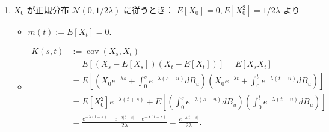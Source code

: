 \documentclass{jsarticle}
\begin{document}
\begin{enumerate}[label=(\roman*)]
    \item
    $X_{0}$ が正規分布 $\mathcal{N}(0, 1/2\lambda)$ に従うとき：
    $E[X_0]=0, E[X_0^2]=1/2\lambda$ より
    \begin{itemize}
        \item 
        $m(t):=E[X_t]=0.$
        \item 
        \begin{align}
            K(s, t)
            &:= \operatorname{cov}(X_{s}, X_{t}) \\
            &= E[(X_s-E[X_s])(X_t-E[X_t])]
            = E[X_s X_t] \\
            &= E[(X_0e^{-\lambda s}+\int_{0}^{s}e^{-\lambda(s-u)}dB_{u})
            (X_0e^{-\lambda t}+\int_{0}^{t}e^{-\lambda(t-u)}dB_{u})] \\
            &= E[X_0^2]e^{-\lambda(t+s)}
            + E[(\int_{0}^{s}e^{-\lambda(s-u)}dB_{u})(\int_{0}^{t}e^{-\lambda(t-u)}dB_{u})] \\
            &= \frac{e^{-\lambda(t+s)}+e^{-\lambda\lvert t-s\rvert}-e^{-\lambda(t+s)}}{2\lambda}
            = \frac{e^{-\lambda\lvert t-s\rvert}}{2\lambda}.
        \end{align}
    \end{itemize}
\end{enumerate}
\end{document}
